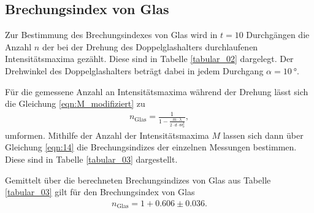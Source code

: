 \subsection{Brechungsindex von Glas}
\noindent Zur Bestimmung des Brechungsindexes von Glas wird in $t = 10$
Durchgängen die Anzahl $n$ der bei der Drehung des Doppelglashalters durchlaufenen
Intensitätsmaxima gezählt. Diese sind in Tabelle \ref{tabular_02} dargelegt.
Der Drehwinkel des Doppelglashalters beträgt dabei in jedem Durchgang $\alpha =
\SI{10}{\degree}$. \\
\FloatBarrier

\FloatBarrier
\noindent Für die gemessene Anzahl an Intensitätsmaxima während der Drehung
lässt sich die Gleichung \ref{eqn:M_modifiziert} zu
\begin{align}
  n_\text{Glas} = \frac{1}{1 - \frac{m \cdot \lambda}{2 \cdot d \cdot \Theta_0^2}},
  \label{eqn:14}
\end{align}
\noindent umformen. Mithilfe der Anzahl der
Intensitätsmaxima $M$ lassen sich dann über Gleichung \ref{eqn:14} die
Brechungsindizes der einzelnen Messungen bestimmen. Diese sind in Tabelle
\ref{tabular_03} dargestellt. \\
\FloatBarrier

\FloatBarrier
\noindent Gemittelt über die berechneten Brechungsindizes von Glas aus Tabelle
\ref{tabular_03} gilt für den Brechungsindex von Glas
\begin{align}
  n_\text{Glas} = 1 +  0.606  \pm  0.036.
\end{align}
